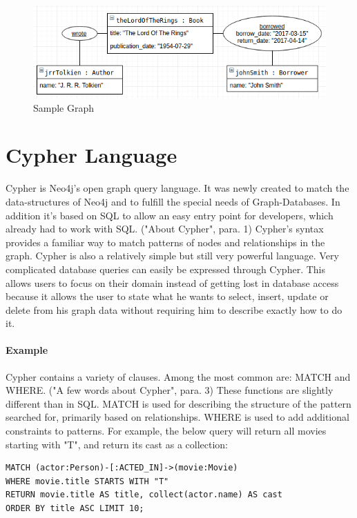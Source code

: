 \begin{figure}[H]
	\includegraphics[width=\linewidth,keepaspectratio]{images/neo4j/data-structure/sample-graph.png}
	\caption{Sample Graph}
\end{figure}

\section{Cypher Language}

Cypher is Neo4j's open graph query language. It was newly created to match the data-structures of Neo4j and to fulfill the special needs of Graph-Databases.
In addition it's based on SQL to allow an easy entry point for developers, which already had to work with SQL. \cite{NeoTechnologyInc.2017d} ("About Cypher", para. 1)
Cypher's syntax provides a familiar way to match patterns of nodes and relationships in the graph.
Cypher is also a relatively simple but still very powerful language.
Very complicated database queries can easily be expressed through Cypher.
This allows users to focus on their domain instead of getting lost in database access because it allows the user to state what he wants to select, insert, update or delete from his graph data without requiring him to describe exactly how to do it.

\paragraph{Example}

Cypher contains a variety of clauses. 
Among the most common are: MATCH and WHERE. \cite{NeoTechnologyInc.2017f}("A few words about Cypher", para. 3)
These functions are slightly different than in SQL.
MATCH is used for describing the structure of the pattern searched for, primarily based on relationships.
WHERE is used to add additional constraints to patterns.
For example, the below query will return all movies starting with "T", and return its cast as a collection:
\begin{lstlisting}[frame=single, caption=Cypher Example, label=cypherexample]
MATCH (actor:Person)-[:ACTED_IN]->(movie:Movie)  
WHERE movie.title STARTS WITH "T"  
RETURN movie.title AS title, collect(actor.name) AS cast  
ORDER BY title ASC LIMIT 10;
\end{lstlisting}

